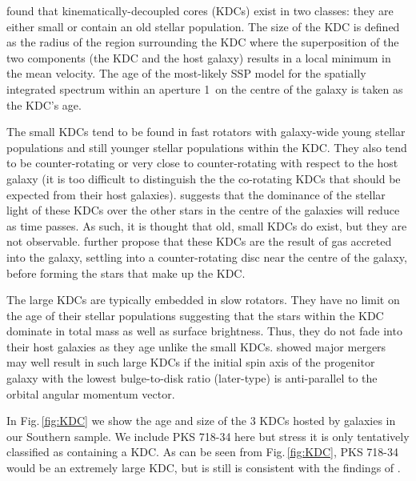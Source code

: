 		\citet{Kuntschner2010} found that kinematically-decoupled cores (KDCs) exist in two classes: they are either small or contain an old stellar population. The size of the KDC is defined as the radius of the region surrounding the KDC where the superposition of the two components (the KDC and the host galaxy) results in a local minimum in the mean velocity. The age of the most-likely SSP model for the spatially integrated spectrum within an aperture 1\arcsec\ on the centre of the galaxy is taken as the KDC's age.

		The small KDCs tend to be found in fast rotators with galaxy-wide young stellar populations and still younger stellar populations within the KDC. They also tend to be counter-rotating or very close to counter-rotating with respect to the host galaxy (it is too difficult to distinguish the the co-rotating KDCs that should be expected from their host galaxies). \citet{Kuntschner2010} suggests that the dominance of the stellar light of these KDCs over the other stars in the centre of the galaxies will reduce as time passes. As such, it is thought that old, small KDCs do exist, but they are not observable. \citet{Kuntschner2010} further propose that these KDCs are the result of gas accreted into the galaxy, settling into a counter-rotating disc near the centre of the galaxy, before forming the stars that make up the KDC. 

		The large KDCs are typically embedded in slow rotators. They have no limit on the age of their stellar populations suggesting that the stars within the KDC dominate in total mass as well as surface brightness. Thus, they do not fade into their host galaxies as they age unlike the small KDCs. \citet{Bois2011} showed major mergers may well result in such large KDCs if the initial spin axis of the progenitor galaxy with the lowest bulge-to-disk ratio (later-type) is anti-parallel to the orbital angular momentum vector. 

		In Fig.\,\ref{fig:KDC} we show the age and size of the 3 KDCs hosted by galaxies in our Southern sample. We include PKS 718-34 here but stress it is only tentatively classified as containing a KDC. As can be seen from Fig.\,\ref{fig:KDC}, PKS 718-34 would be an extremely large KDC, but is still is consistent with the findings of \citet{Kuntschner2010}.

